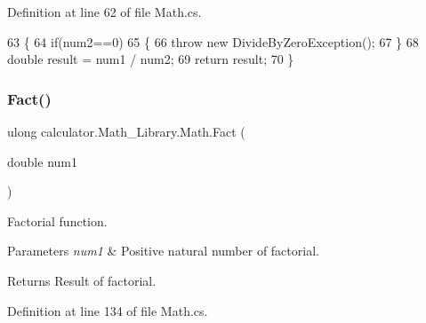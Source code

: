 Definition at line 62 of file Math.\+cs.


\begin{DoxyCode}
63         \{
64             \textcolor{keywordflow}{if}(num2==0)
65             \{
66                 \textcolor{keywordflow}{throw} \textcolor{keyword}{new} DivideByZeroException();
67             \}
68             \textcolor{keywordtype}{double} result = num1 / num2;
69             \textcolor{keywordflow}{return} result;
70         \}
\end{DoxyCode}
\mbox{\label{classcalculator_1_1_math___library_1_1_math_ad339abe4860ee891b54f9bddc38d1bed}} 
\subsubsection{Fact()}
{\footnotesize\ttfamily ulong calculator.\+Math\+\_\+\+Library.\+Math.\+Fact (\begin{DoxyParamCaption}\item[{double}]{num1 }\end{DoxyParamCaption})}



Factorial function. 


\begin{DoxyParams}{Parameters}
{\em num1} & Positive natural number of factorial.\\
\hline
\end{DoxyParams}
\begin{DoxyReturn}{Returns}
Result of factorial.
\end{DoxyReturn}


Definition at line 134 of file Math.\+cs.


